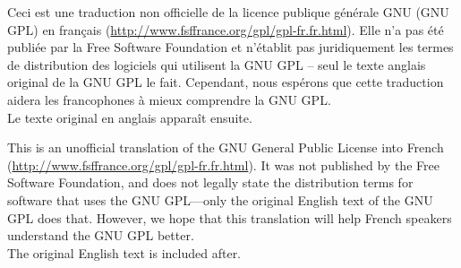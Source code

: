 

Ceci est une traduction non officielle de la licence publique générale GNU (GNU GPL) en français (\url{http://www.fsffrance.org/gpl/gpl-fr.fr.html}). Elle n'a pas été publiée par la Free Software Foundation et n'établit pas juridiquement les termes de distribution des logiciels qui utilisent la GNU GPL – seul le texte anglais original de la GNU GPL le fait. Cependant, nous espérons que cette traduction aidera les francophones à mieux comprendre la GNU GPL.\\ 
Le texte original en anglais apparaît ensuite.

This is an unofficial translation of the GNU General Public License into French (\url{http://www.fsffrance.org/gpl/gpl-fr.fr.html}). It was not published by the Free Software Foundation, and does not legally state the distribution terms for software that uses the GNU GPL—only the original English text of the GNU GPL does that. However, we hope that this translation will help French speakers understand the GNU GPL better.\\
The original English text is included after.
\newpage


